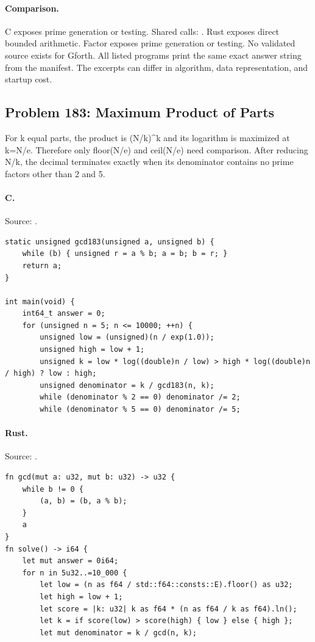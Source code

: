 \paragraph{Comparison.}
C exposes prime generation or testing. Shared calls: \texttt{}. Rust exposes direct bounded arithmetic. Factor exposes prime generation or testing.
No validated source exists for Gforth.
All listed programs print the same exact answer string from the manifest. The excerpts can differ in algorithm, data representation, and startup cost.

\subsection{Problem 183: Maximum Product of Parts}
\label{walkthrough:p183}
For k equal parts, the product is (N/k)\textasciicircum{}k and its logarithm is maximized at k=N/e. Therefore only floor(N/e) and ceil(N/e) need comparison. After reducing N/k, the decimal terminates exactly when its denominator contains no prime factors other than 2 and 5.

\paragraph{C.} Source: .
\begin{lstlisting}
static unsigned gcd183(unsigned a, unsigned b) {
    while (b) { unsigned r = a % b; a = b; b = r; }
    return a;
}

int main(void) {
    int64_t answer = 0;
    for (unsigned n = 5; n <= 10000; ++n) {
        unsigned low = (unsigned)(n / exp(1.0));
        unsigned high = low + 1;
        unsigned k = low * log((double)n / low) > high * log((double)n / high) ? low : high;
        unsigned denominator = k / gcd183(n, k);
        while (denominator % 2 == 0) denominator /= 2;
        while (denominator % 5 == 0) denominator /= 5;
\end{lstlisting}

\paragraph{Rust.} Source: .
\begin{lstlisting}
fn gcd(mut a: u32, mut b: u32) -> u32 {
    while b != 0 {
        (a, b) = (b, a % b);
    }
    a
}
fn solve() -> i64 {
    let mut answer = 0i64;
    for n in 5u32..=10_000 {
        let low = (n as f64 / std::f64::consts::E).floor() as u32;
        let high = low + 1;
        let score = |k: u32| k as f64 * (n as f64 / k as f64).ln();
        let k = if score(low) > score(high) { low } else { high };
        let mut denominator = k / gcd(n, k);
\end{lstlisting}

